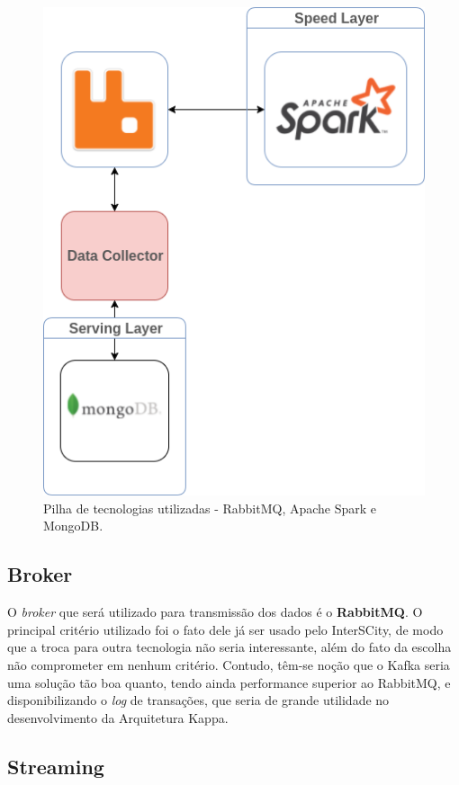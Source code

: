 \begin{figure}
  \centering
    \includegraphics[scale=0.5]{figuras/stack.png}
  \caption{Pilha de tecnologias utilizadas - RabbitMQ, Apache Spark e MongoDB.}
  \label{fig:stack}
\end{figure}


\subsection{Broker}

O \textit{broker} que será utilizado para transmissão dos dados é o
\textbf{RabbitMQ}. O principal critério utilizado foi o fato dele já ser usado
pelo InterSCity, de modo que a troca para outra tecnologia não seria
interessante, além do fato da escolha não comprometer em nenhum critério.
Contudo, têm-se noção que o Kafka seria uma solução tão boa quanto, tendo ainda
performance superior ao RabbitMQ, e disponibilizando o \textit{log} de
transações, que seria de grande utilidade no desenvolvimento da Arquitetura
Kappa.

\subsection{Streaming}

